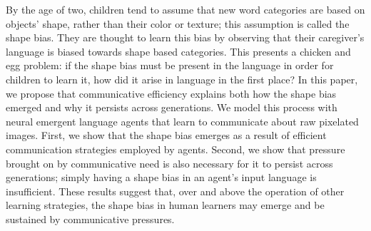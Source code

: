 By the age of two, children tend to assume that new word categories are based on objects' shape, rather than their color or texture; this assumption is called the shape bias. They are thought to learn this bias by observing that their caregiver's language is biased towards shape based categories. This presents a chicken and egg problem: if the shape bias must be present in the language in order for children to learn it, how did it arise in language in the first place? In this paper, we propose that communicative efficiency explains both how the shape bias emerged and why it persists across generations. We model this process with neural emergent language agents that learn to communicate about raw pixelated images. First, we show that the shape bias emerges as a result of efficient communication strategies employed by agents. Second, we show that pressure brought on by communicative need is also necessary for it to persist across generations; simply having a shape bias in an agent's input language is insufficient. These results suggest that, over and above the operation of other learning strategies, the shape bias in human learners may emerge and be sustained by communicative pressures.
